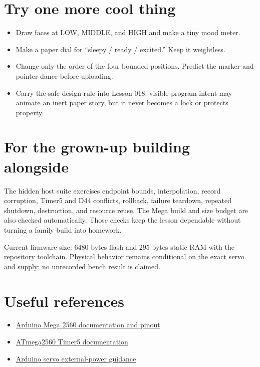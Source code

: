 \documentclass[11pt]{article}
\begin{document}
\section*{Try one more cool thing}

\begin{itemize}
  \item Draw faces at LOW, MIDDLE, and HIGH and make a tiny mood meter.
  \item Make a paper dial for ``sleepy / ready / excited.'' Keep it weightless.
  \item Change only the order of the four bounded positions. Predict the
  marker-and-pointer dance before uploading.
  \item Carry the safe design rule into Lesson 018: visible program intent may
  animate an inert paper story, but it never becomes a lock or protects property.
\end{itemize}

\section*{For the grown-up building alongside}

The hidden host suite exercises endpoint bounds, interpolation, record
corruption, Timer5 and D44 conflicts, rollback, failure teardown, repeated
shutdown, destruction, and resource reuse. The Mega build and size budget are
also checked automatically. Those checks keep the lesson dependable without
turning a family build into homework.

Current firmware size: 6480 bytes flash and 295 bytes static RAM with the
repository toolchain. Physical behavior remains conditional on the exact
servo and supply; no unrecorded bench result is claimed.

\section*{Useful references}

\begin{itemize}
  \item \href{https://docs.arduino.cc/hardware/mega-2560}
  {Arduino Mega 2560 documentation and pinout}
  \item \href{https://www.microchip.com/en-us/product/atmega2560}
  {ATmega2560 Timer5 documentation}
  \item \href{https://docs.arduino.cc/libraries/servo/}
  {Arduino servo external-power guidance}
\end{itemize}
\end{document}

